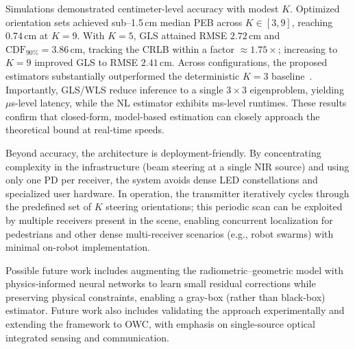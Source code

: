 \documentclass[journal]{IEEEtran}
\begin{document}
Simulations demonstrated centimeter-level accuracy with modest \(K\). Optimized orientation sets achieved sub–1.5\,cm median PEB across \(K\in[3,9]\), reaching \(0.74\,\mathrm{cm}\) at \(K=9\). With \(K=5\), GLS attained RMSE \(2.72\,\mathrm{cm}\) and \(\mathrm{CDF}_{90\%}=3.86\,\mathrm{cm}\), tracking the CRLB within a factor \(\approx1.75\times\); increasing to \(K=9\) improved GLS to RMSE \(2.41\,\mathrm{cm}\). 
Across configurations, the proposed estimators substantially outperformed the deterministic \(K=3\) baseline~\cite{Chassagne2025}.
Importantly, GLS/WLS reduce inference to a single \(3\times3\) eigenproblem, yielding \(\mu\)s-level latency, while the NL estimator exhibits ms-level runtimes. These results confirm that closed-form, model-based estimation can closely approach the theoretical bound at real-time speeds.

Beyond accuracy, the architecture is deployment-friendly. By concentrating complexity in the infrastructure (beam steering at a single NIR source) and using only one PD per receiver, the system avoids dense LED constellations and specialized user hardware. In operation, the transmitter iteratively cycles through the predefined set of \(K\) steering orientations; this periodic scan can be exploited by multiple receivers present in the scene, enabling concurrent localization for pedestrians and other dense multi-receiver scenarios (e.g., robot swarms) with minimal on-robot implementation.

Possible future work includes augmenting the radiometric–geometric model with physics‐informed neural networks to learn small residual corrections while preserving physical constraints, enabling a gray-box (rather than black-box) estimator. Future work also includes validating the approach experimentally and extending the framework to OWC, with emphasis on single-source optical integrated sensing and communication.

\appendices
\end{document}
